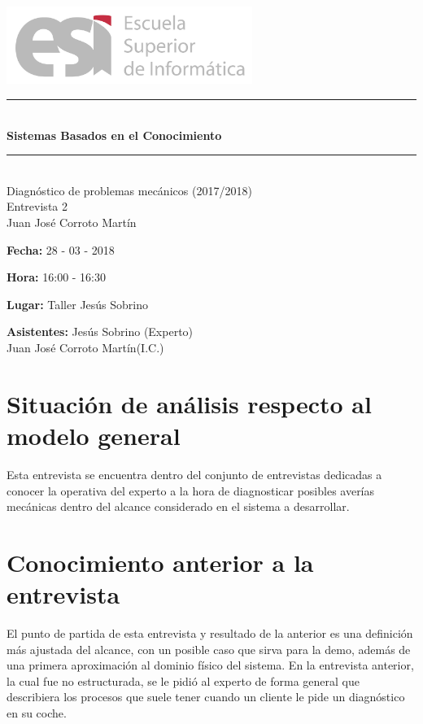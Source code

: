 \documentclass[a4paper,12pt]{article}
\newcommand\tab[1][1cm]{\hspace*{#1}}
\begin{document}
\begin{titlepage}
\begin{center}

\includegraphics[width=0.6\textwidth]{logoesi}\\[5cm]

\rule{\linewidth}{0.5mm} \\[0.4cm]
{ \huge \bfseries Sistemas Basados en el Conocimiento\\[0.4cm] }
\rule{\linewidth}{0.5mm} \\[1.5cm]
{\huge Diagnóstico de problemas mecánicos (2017/2018)\\Entrevista 2}\\[0.5cm]

\large{Juan Jos\'e Corroto Mart\'in}

\end{center}
\end{titlepage}

\tableofcontents
\newpage

\textbf{Fecha:} 28 - 03 - 2018 

\textbf{Hora: } 16:00 - 16:30

\textbf{Lugar:} Taller Jesús Sobrino

\textbf{Asistentes:} Jesús Sobrino  (Experto)\\ \tab \tab \tab Juan José Corroto Martín(I.C.) 

\section{Situación de análisis respecto al modelo general}
 Esta entrevista se encuentra dentro del conjunto de entrevistas dedicadas a conocer la operativa del experto a la hora de diagnosticar posibles averías mecánicas dentro del alcance considerado en el sistema a desarrollar. 
 
\section{Conocimiento anterior a la entrevista}
El punto de partida de esta entrevista y resultado de la anterior es una definición más ajustada del alcance, con un posible caso que sirva para la demo, además de una primera aproximación al dominio físico del sistema. En la entrevista anterior, la cual fue no estructurada, se le pidió al experto de forma general que describiera los procesos que suele tener cuando un cliente le pide un diagnóstico en su coche.
\end{document}

